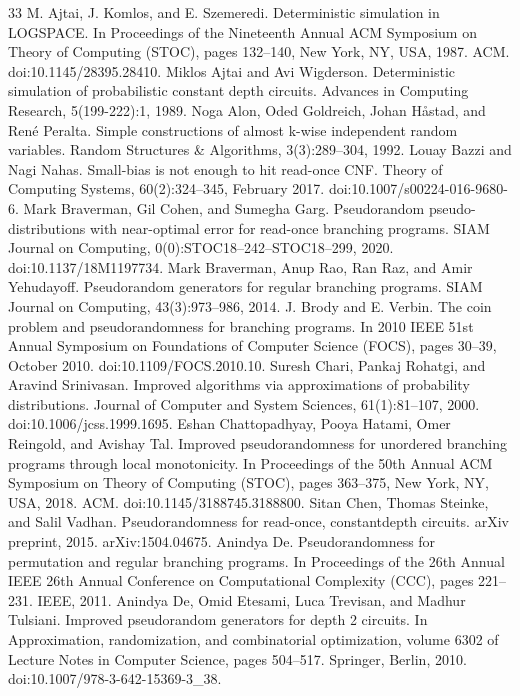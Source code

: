 \documentclass[10pt,a4paper]{article}
\begin{document}
\begin{thebibliography}{33}
 M. Ajtai, J. Komlos, and E. Szemeredi. Deterministic simulation in LOGSPACE. In Proceedings of the Nineteenth Annual ACM Symposium on Theory of Computing (STOC), pages 132–140, New York, NY, USA, 1987. ACM. doi:10.1145/28395.28410.
 Miklos Ajtai and Avi Wigderson. Deterministic simulation of probabilistic constant depth circuits. Advances in Computing Research, 5(199-222):1, 1989.
 Noga Alon, Oded Goldreich, Johan Håstad, and René Peralta. Simple constructions of almost k-wise independent random variables. Random Structures \& Algorithms, 3(3):289–304, 1992.
 Louay Bazzi and Nagi Nahas. Small-bias is not enough to hit read-once CNF. Theory of Computing Systems, 60(2):324–345, February 2017. doi:10.1007/s00224-016-9680-6.
 Mark Braverman, Gil Cohen, and Sumegha Garg. Pseudorandom pseudo-distributions with near-optimal error for read-once branching programs. SIAM Journal on Computing, 0(0):STOC18–242–STOC18–299, 2020. doi:10.1137/18M1197734.
 Mark Braverman, Anup Rao, Ran Raz, and Amir Yehudayoff. Pseudorandom generators for regular branching programs. SIAM Journal on Computing, 43(3):973–986, 2014.
 J. Brody and E. Verbin. The coin problem and pseudorandomness for branching programs. In 2010 IEEE 51st Annual Symposium on Foundations of Computer Science (FOCS), pages 30–39, October 2010. doi:10.1109/FOCS.2010.10.
 Suresh Chari, Pankaj Rohatgi, and Aravind Srinivasan. Improved algorithms via approximations of probability distributions. Journal of Computer and System Sciences, 61(1):81–107, 2000. doi:10.1006/jcss.1999.1695.
 Eshan Chattopadhyay, Pooya Hatami, Omer Reingold, and Avishay Tal. Improved pseudorandomness for unordered branching programs through local monotonicity. In Proceedings of the 50th Annual ACM Symposium on Theory of Computing (STOC), pages 363–375, New York, NY, USA, 2018. ACM. doi:10.1145/3188745.3188800.
 Sitan Chen, Thomas Steinke, and Salil Vadhan. Pseudorandomness for read-once, constantdepth circuits. arXiv preprint, 2015. arXiv:1504.04675.
 Anindya De. Pseudorandomness for permutation and regular branching programs. In Proceedings of the 26th Annual IEEE 26th Annual Conference on Computational Complexity (CCC), pages 221–231. IEEE, 2011.
 Anindya De, Omid Etesami, Luca Trevisan, and Madhur Tulsiani. Improved pseudorandom generators for depth 2 circuits. In Approximation, randomization, and combinatorial optimization, volume 6302 of Lecture Notes in Computer Science, pages 504–517. Springer, Berlin, 2010. doi:10.1007/978-3-642-15369-3\_38.

\end{thebibliography}
\end{document}
